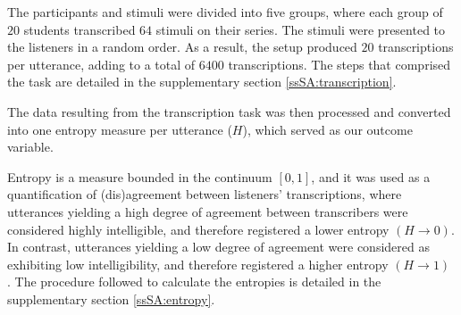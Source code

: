 The participants and stimuli were divided into five groups, where each group of $20$ students transcribed $64$ stimuli on their series. The stimuli were presented to the listeners in a random order. As a result, the setup produced $20$ transcriptions per utterance, adding to a total of $6400$ transcriptions. The steps that comprised the task are detailed in the supplementary section \ref{ssSA:transcription}. 
%
\begin{comment}
	present the stimuli based on the \textcolor{blue}{adaptive pairing algorithm} \citep{Pollitt_2012b}?
\end{comment}

The data resulting from the transcription task was then processed and converted into one entropy measure per utterance ($H$), which served as our outcome variable. 

Entropy is a measure bounded in the continuum $[0,1]$, and it was used as a quantification of (dis)agreement between listeners' transcriptions, where utterances yielding a high degree of agreement between transcribers were considered highly intelligible, and therefore registered a lower entropy $\left( H \rightarrow 0 \right)$. In contrast, utterances yielding a low degree of agreement were considered as exhibiting low intelligibility, and therefore registered a higher entropy $\left( H \rightarrow 1 \right)$ \citep{Boonen_et_al_2021, Faes_et_al_2021}. The procedure followed to calculate the entropies is detailed in the supplementary section \ref{ssSA:entropy}.
%
\begin{comment}
	\textbf{for the experimenter:} Based on \citet{Faes_et_al_2021} we depict the procedure for the experimenter:
	\begin{enumerate}
		\item 1. matching procedure 
		\item selection of suitable stimuli
		\item determine the number of stimuli per judge 
	\end{enumerate}	
\end{comment}
%
%
